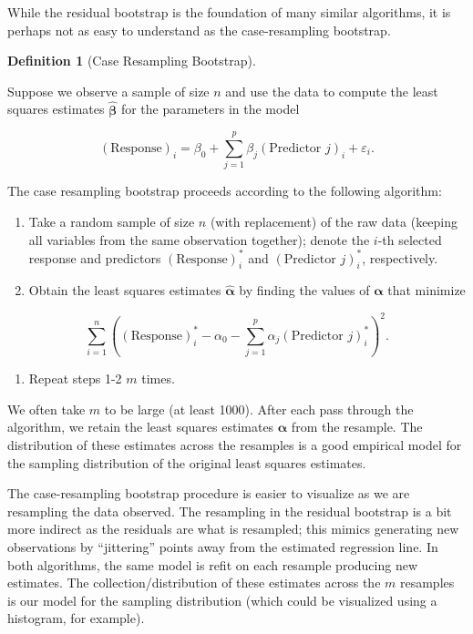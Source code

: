 \documentclass[
  letterpaper,
  DIV=11,
  numbers=noendperiod]{scrreprt}
\providecommand{\tightlist}{%
  \setlength{\itemsep}{0pt}\setlength{\parskip}{0pt}}\usepackage{longtable,booktabs,array}
\theoremstyle{definition}
\theoremstyle{definition}
\newtheorem{definition}{Definition}[chapter]
\theoremstyle{remark}
\begin{document}
While the residual bootstrap is the foundation of many similar
algorithms, it is perhaps not as easy to understand as the
case-resampling bootstrap.

\begin{definition}[Case Resampling
Bootstrap]\protect\hypertarget{def-case-resampling-bootstrap}{}\label{def-case-resampling-bootstrap}

Suppose we observe a sample of size \(n\) and use the data to compute
the least squares estimates \(\widehat{\boldsymbol{\beta}}\) for the
parameters in the model

\[(\text{Response})_i = \beta_0 + \sum_{j=1}^{p} \beta_j (\text{Predictor } j)_i + \varepsilon_i.\]

The case resampling bootstrap proceeds according to the following
algorithm:

\begin{enumerate}
\def\labelenumi{\arabic{enumi}.}
\tightlist
\item
  Take a random sample of size \(n\) (with replacement) of the raw data
  (keeping all variables from the same observation together); denote the
  \(i\)-th selected response and predictors \((\text{Response})_i^*\)
  and \((\text{Predictor } j)_i^*\), respectively.
\item
  Obtain the least squares estimates \(\widehat{\boldsymbol{\alpha}}\)
  by finding the values of \(\boldsymbol{\alpha}\) that minimize
\end{enumerate}

\[\sum_{i=1}^{n} \left((\text{Response})_i^* - \alpha_0 - \sum_{j=1}^{p} \alpha_j (\text{Predictor } j)_i^*\right)^2.\]

\begin{enumerate}
\def\labelenumi{\arabic{enumi}.}
\setcounter{enumi}{2}
\tightlist
\item
  Repeat steps 1-2 \(m\) times.
\end{enumerate}

We often take \(m\) to be large (at least 1000). After each pass through
the algorithm, we retain the least squares estimates
\(\widehat{\boldsymbol{\alpha}}\) from the resample. The distribution of
these estimates across the resamples is a good empirical model for the
sampling distribution of the original least squares estimates.

\end{definition}

The case-resampling bootstrap procedure is easier to visualize as we are
resampling the data observed. The resampling in the residual bootstrap
is a bit more indirect as the residuals are what is resampled; this
mimics generating new observations by ``jittering'' points away from the
estimated regression line. In both algorithms, the same model is refit
on each resample producing new estimates. The collection/distribution of
these estimates across the \(m\) resamples is our model for the sampling
distribution (which could be visualized using a histogram, for example).
\end{document}
